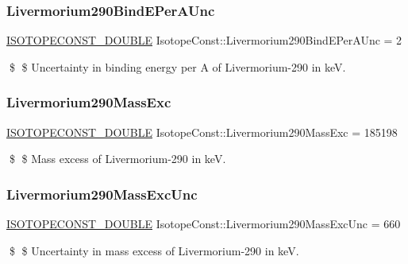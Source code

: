 \subsubsection{\texorpdfstring{Livermorium290\+Bind\+E\+Per\+A\+Unc}{Livermorium290BindEPerAUnc}}
{\footnotesize\ttfamily \mbox{\hyperlink{group___isotope_const-_macros_ga8f45a7272ce02c0b4c65c44636ed719a}{I\+S\+O\+T\+O\+P\+E\+C\+O\+N\+S\+T\+\_\+\+D\+O\+U\+B\+LE}} Isotope\+Const\+::\+Livermorium290\+Bind\+E\+Per\+A\+Unc = 2}

\$ \$ Uncertainty in binding energy per A of Livermorium-\/290 in keV. \mbox{\label{group___isotope_const-_livermorium-_lv290_ga0ffb07f8671369bcf5ec5c55950bcc40}} 
\subsubsection{\texorpdfstring{Livermorium290\+Mass\+Exc}{Livermorium290MassExc}}
{\footnotesize\ttfamily \mbox{\hyperlink{group___isotope_const-_macros_ga8f45a7272ce02c0b4c65c44636ed719a}{I\+S\+O\+T\+O\+P\+E\+C\+O\+N\+S\+T\+\_\+\+D\+O\+U\+B\+LE}} Isotope\+Const\+::\+Livermorium290\+Mass\+Exc = 185198}

\$ \$ Mass excess of Livermorium-\/290 in keV. \mbox{\label{group___isotope_const-_livermorium-_lv290_gae6dc422724b9a19713a4f9f06ad6f292}} 
\subsubsection{\texorpdfstring{Livermorium290\+Mass\+Exc\+Unc}{Livermorium290MassExcUnc}}
{\footnotesize\ttfamily \mbox{\hyperlink{group___isotope_const-_macros_ga8f45a7272ce02c0b4c65c44636ed719a}{I\+S\+O\+T\+O\+P\+E\+C\+O\+N\+S\+T\+\_\+\+D\+O\+U\+B\+LE}} Isotope\+Const\+::\+Livermorium290\+Mass\+Exc\+Unc = 660}

\$ \$ Uncertainty in mass excess of Livermorium-\/290 in keV. \mbox{\label{group___isotope_const-_livermorium-_lv290_gaf96389d0d0bd368e2d5f5d921d4e063a}} 
